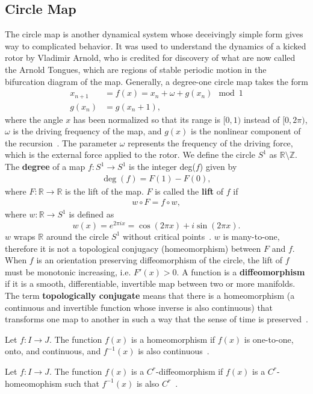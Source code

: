 \subsection{Circle Map}
The circle map is another
dynamical system whose deceivingly simple form gives way to complicated behavior. It was used to
understand the dynamics of a kicked rotor by Vladimir
Arnold, who is credited for discovery of what are now called the Arnold Tongues, which are
regions of stable periodic motion in the bifurcation diagram of the
map. Generally, a degree-one circle map takes the form
\begin{align*}
x_{n+1}&=f(x)=x_n + \omega + g(x_n) \mod 1\\
g(x_n)&=g(x_n + 1),
\end{align*}
where the angle $x$ has been normalized so that its range is $[0,1)$
instead of $[0,2\pi )$, $\omega$ is the driving frequency of the map, and
$g(x)$ is the nonlinear component of the recursion~\cite{rasband}. The
parameter $\omega$ represents the frequency of the driving
force, which is the external force applied to the
rotor. We define the circle $S^1$ as $\mathbb{R} \setminus
\mathbb{Z}$. The \textbf{degree} of a map $f:S^1 \to S^1$ is the integer
deg($f$) given by 
\begin{align*}
\deg(f) = F(1) - F(0),
\end{align*}
where $F:\mathbb{R} \to \mathbb{R}$ is the lift of the
map. $F$ is called the \textbf{lift} of $f$ if
\begin{align*}
w \circ F = f \circ w,
\end{align*}
where $w:\mathbb{R} \to S^1$ is defined as
\begin{equation*}
w(x) = e^{2\pi i x} = \cos(2\pi x) + i\sin(2\pi x).
\end{equation*}
$w$ wraps $\mathbb{R}$ around the circle $S^1$ without critical
points~\cite{devaney}. $w$ is many-to-one, therefore it is not a
topological conjugacy (homeomorphism)
between $F$ and $f$. When $f$ is an orientation
preserving diffeomorphism of the circle, the lift of $f$ must be
monotonic increasing, i.e. $F'(x)>0$. A function is a \textbf{diffeomorphism}
if it is a smooth, differentiable, invertible map between two or more
manifolds. The term \textbf{topologically conjugate} means that there
is a homeomorphism (a continuous and invertible function whose inverse
is also continuous)
that transforms one map to another in such a way that the sense of
time is preserved~\cite{strogatz}.

\begin{singlespacing}
\begin{definition}
Let $f:I \to J$. The function $f(x)$ is a homeomorphism if $f(x)$ is
one-to-one, onto, and continuous, and $f^{-1}(x)$ is also continuous~\cite{devaney}.
\end{definition}
\begin{definition}
Let $f:I\to J$. The function $f(x)$ is a $C^r$-diffeomorphism if
$f(x)$ is a $C^r$-homeomophism such that $f^{-1}(x)$ is also $C^r$~\cite{devaney}. 
\end{definition}
\end{singlespacing}

